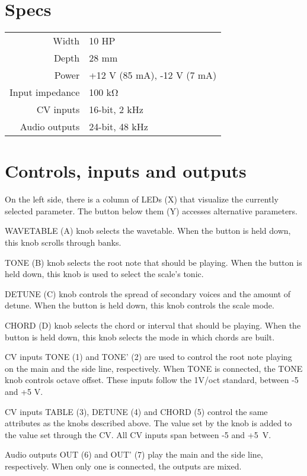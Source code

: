 \documentclass[10pt,nofoldmark,nocombine]{leaflet} %
\begin{document}
\section{Specs}

\begin{tabular}{@{}rl@{}}
  Width & 10 HP \\
  Depth & 28 mm \\
  Power & +12 V (85 mA), -12 V (7 mA) \\
  Input impedance & 100 kΩ \\
  CV inputs & 16-bit, 2 kHz \\
  Audio outputs & 24-bit, 48 kHz
\end{tabular}

\section{Controls, inputs and outputs}

On the left side, there is a column of LEDs (X) that visualize the currently selected parameter. The button below them (Y) accesses alternative parameters.

WAVETABLE (A) knob selects the wavetable. When the button is held down, this knob scrolls through banks.

TONE (B) knob selects the root note that should be playing. When the button is held down, this knob is used to select the scale's tonic.

DETUNE (C) knob controls the spread of secondary voices and the amount of detune. When the button is held down, this knob controls the scale mode.

CHORD (D) knob selects the chord or interval that should be playing. When the button is held down, this knob selects the mode in which chords are built.

CV inputs TONE (1) and TONE' (2) are used to control the root note playing on the main and the side line, respectively. When TONE is connected, the TONE knob controls octave offset. These inputs follow the 1V/oct standard, between -5 and +5 V.

CV inputs TABLE (3), DETUNE (4) and CHORD (5) control the same attributes as the knobs described above. The value set by the knob is added to the value set through the CV. All CV inputs span between -5 and +5~V.

Audio outputs OUT (6) and OUT' (7) play the main and the side line, respectively. When only one is connected, the outputs are mixed.
\end{document}
